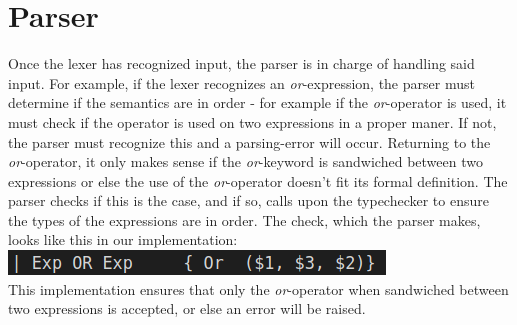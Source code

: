 \section{Parser}
Once the lexer has recognized input, the parser is in charge of handling said input. For example, if the lexer recognizes an \textit{or}-expression, the parser must determine if the semantics are in order - for example if the \textit{or}-operator is used, it must check if the operator is used on two expressions in a proper maner. If not, the parser must recognize this and a parsing-error will occur. Returning to the \textit{or}-operator, it only makes sense if the \textit{or}-keyword is sandwiched between two expressions or else the use of the \textit{or}-operator doesn't fit its formal definition. The parser checks if this is the case, and if so, calls upon the typechecker to ensure the types of the expressions are in order. The check, which the parser makes, looks like this in our implementation:\\
\includegraphics[width=\linewidth]{Materials/Parser/Or}\\
This implementation ensures that only the \textit{or}-operator when sandwiched between two expressions is accepted, or else an error will be raised. 
